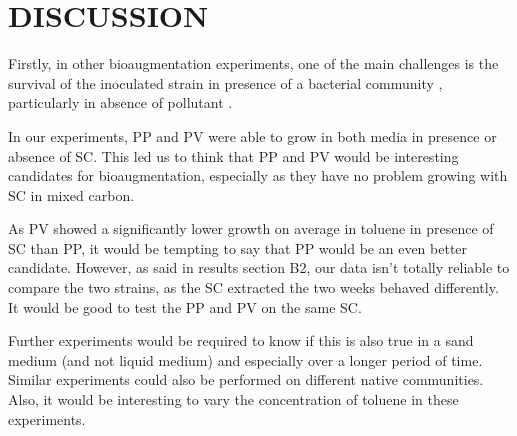 \documentclass[a4paper, 10pt, conference]{ieeeconf}   %
\begin{document}
\section{DISCUSSION}


%	 
%	  

Firstly, in other bioaugmentation experiments, one of the main challenges is the survival of the inoculated strain in presence of a bacterial community \cite{bouchez} \cite{oldarticle}, particularly in absence of pollutant \cite{nodrawback}.

In our experiments, PP and PV were able to grow in both media in presence or absence of SC. This led us to think that PP and PV would be interesting candidates for bioaugmentation, especially as they have no problem growing with SC in mixed carbon. 

As PV showed a significantly lower growth on average in toluene in presence of SC than PP, it would be tempting to say that PP would be an even better candidate. However, as said in results section B2, our data isn't totally reliable to compare the two strains, as the SC extracted the two weeks behaved differently. It would be good to test the PP and PV on the same SC. 

Further experiments would be required to know if this is also true in a sand medium (and not liquid medium) and especially over a longer period of time. Similar experiments could also be performed on different native communities. Also, it would be interesting to vary the concentration of toluene in these experiments. 
\end{document}
